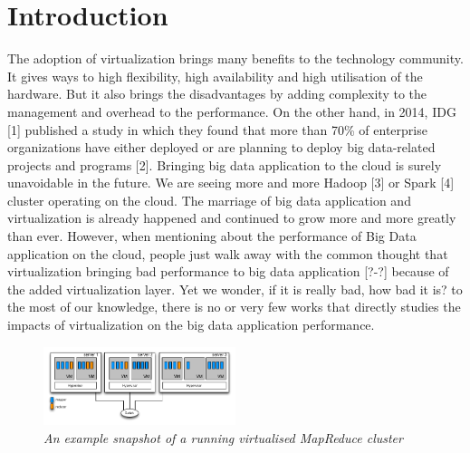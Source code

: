 \documentclass{acmsig}
\begin{document}
\section{Introduction}

The adoption of virtualization brings many benefits to the technology community. It gives ways to high flexibility, high availability and high utilisation of the hardware. But it also brings the disadvantages by adding complexity to the management and overhead to the performance. On the other hand, in 2014, IDG [1] published a study in which they found that more than 70\% of enterprise organizations have either deployed or are planning to deploy big data-related projects and programs [2]. Bringing big data application to the cloud is surely unavoidable in the future. We are seeing more and more Hadoop [3] or Spark [4] cluster operating on the cloud. The marriage of big data application and virtualization is already happened and continued to grow more and more greatly than ever. However, when mentioning about the performance of Big Data application on the cloud, people just walk away with the common thought that virtualization bringing bad performance to big data application [?-?] because of the added virtualization layer. Yet we wonder, if it is really bad, how bad it is? to the most of our knowledge, there is no or very few works that directly studies the impacts of virtualization on the big data application performance.

\begin{figure}[htbp]
    \centering
    \includegraphics[width=0.5\textwidth]{figures/cluster_snapshot.png}
    \caption{\textit{An example snapshot of a running virtualised MapReduce cluster}}
    \label{cluster_snapshot}
\end{figure}

\end{document}
